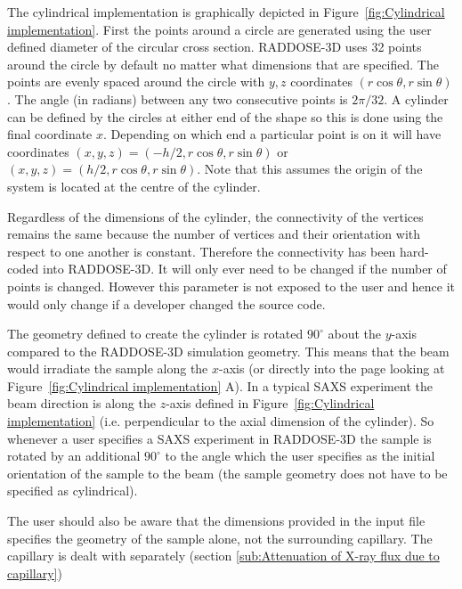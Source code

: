 The cylindrical implementation is graphically depicted in Figure~\ref{fig:Cylindrical implementation}.
First the points around a circle are generated using the user defined diameter of the circular cross section.
RADDOSE-3D uses 32 points around the circle by default no matter what dimensions that are specified.
The points are evenly spaced around the circle with $y, z$ coordinates $(r \cos \theta, r \sin \theta)$.
The angle (in radians) between any two consecutive points is $2 \pi / 32$.
A cylinder can be defined by the circles at either end of the shape so this is done using the final coordinate $x$.
Depending on which end a particular point is on it will have coordinates $(x, y, z) = (-h/2, r \cos \theta, r \sin \theta)$ or $(x, y, z) = (h/2, r \cos \theta, r \sin \theta)$.
Note that this assumes the origin of the system is located at the centre of the cylinder.

Regardless of the dimensions of the cylinder, the connectivity of the vertices remains the same because the number of vertices and their orientation with respect to one another is constant.
Therefore the connectivity has been hard-coded into RADDOSE-3D.
It will only ever need to be changed if the number of points is changed.
However this parameter is not exposed to the user and hence it would only change if a developer changed the source code.

The geometry defined to create the cylinder is rotated $90^{\circ}$ about the $y$-axis compared to the RADDOSE-3D simulation geometry.
This means that the beam would irradiate the sample along the $x$-axis (or directly into the page looking at Figure~\ref{fig:Cylindrical implementation} A).
In a typical SAXS experiment the beam direction is along the $z$-axis defined in Figure~\ref{fig:Cylindrical implementation}  (i.e. perpendicular to the axial dimension of the cylinder).
So whenever a user specifies a SAXS experiment in RADDOSE-3D the sample is rotated by an additional $90^{\circ}$ to the angle which the user specifies as the initial orientation of the sample to the beam (the sample geometry does not have to be specified as cylindrical).

The user should also be aware that the dimensions provided in the input file specifies the geometry of the sample alone, not the surrounding capillary. The capillary is dealt with separately (section \ref{sub:Attenuation of X-ray flux due to capillary})

